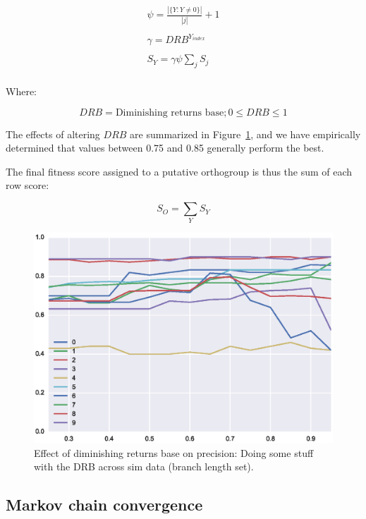 \documentclass[twocolumn]{bmcart}  %
\begin{document}
\begin{gather*}
    \psi = \frac{|\{Y:Y \neq 0\}|}{|j|} + 1\\
    \\
    \gamma = DRB^{Y_{index}}\\
    \\
    S_Y = \gamma\psi\sum_{j} S_j\\
\end{gather*}

Where:

\[
DRB = \text{Diminishing returns base}; 0 \leq DRB \leq 1
\]

The effects of altering $DRB$ are summarized in Figure~\ref{fig:dim_rets}, and we have empirically determined that values between 0.75 and 0.85 generally perform the best.

The final fitness score assigned to a putative orthogroup is thus the sum of each row score:

\[
S_O = \sum_{Y} S_Y
\]

\begin{figure}[t]
  \begin{center}
  \includegraphics[height=0.22\textheight]{../figures/dim_ret_precision_line.eps}
\end{center}
\caption{Effect of diminishing returns base on precision: Doing some stuff with the DRB across sim data (branch length set).}
\label{fig:dim_rets}
\end{figure}


\subsection{Markov chain convergence}\label{subsec:markovChainConvergence}
\end{document}
